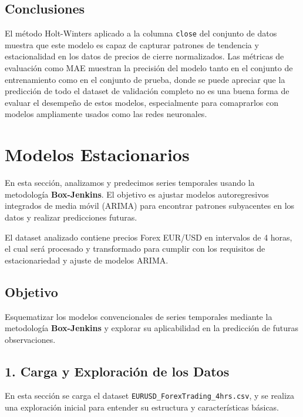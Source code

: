 \documentclass[
]{book}
\begin{document}
\section{Conclusiones}\label{conclusiones}

El método Holt-Winters aplicado a la columna \texttt{close} del conjunto de datos muestra que este modelo es capaz de capturar patrones de tendencia y estacionalidad en los datos de precios de cierre normalizados. Las métricas de evaluación como MAE muestran la precisión del modelo tanto en el conjunto de entrenamiento como en el conjunto de prueba, donde se puede apreciar que la predicción de todo el dataset de validación completo no es una buena forma de evaluar el desempeño de estos modelos, especialmente para comaprarlos con modelos ampliamente usados como las redes neuronales.

\chapter{Modelos Estacionarios}\label{modelos-estacionarios}

En esta sección, analizamos y predecimos series temporales usando la metodología \textbf{Box-Jenkins}. El objetivo es ajustar modelos autoregresivos integrados de media móvil (ARIMA) para encontrar patrones subyacentes en los datos y realizar predicciones futuras.

El dataset analizado contiene precios Forex EUR/USD en intervalos de 4 horas, el cual será procesado y transformado para cumplir con los requisitos de estacionariedad y ajuste de modelos ARIMA.

\section{Objetivo}\label{objetivo}

Esquematizar los modelos convencionales de series temporales mediante la metodología \textbf{Box-Jenkins} y explorar su aplicabilidad en la predicción de futuras observaciones.

\section{1. Carga y Exploración de los Datos}\label{carga-y-exploraciuxf3n-de-los-datos}

En esta sección se carga el dataset \texttt{EURUSD\_ForexTrading\_4hrs.csv}, y se realiza una exploración inicial para entender su estructura y características básicas.
\end{document}
